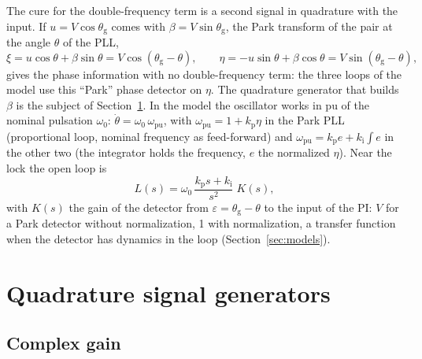 \documentclass[11pt,a4paper]{scrartcl}
\newcommand{\ped}[1]{_{\mathrm{#1}}}
\begin{document}
\begin{onehalfspace}
The cure for the double-frequency term is a second signal in quadrature with the input. If $u = V\cos\theta\ped{g}$ comes with $\beta = V\sin\theta\ped{g}$, the Park transform of the pair at the angle $\theta$ of the PLL,
\begin{equation}
	\xi = u\cos\theta + \beta\sin\theta = V\cos(\theta\ped{g} - \theta), \qquad \eta = -u\sin\theta + \beta\cos\theta = V\sin(\theta\ped{g} - \theta),
	\label{eq:park}
\end{equation}
gives the phase information with no double-frequency term: the three loops of the model use this ``Park'' phase detector on $\eta$. The quadrature generator that builds $\beta$ is the subject of Section~\ref{sec:qsg}. In the model the oscillator works in pu of the nominal pulsation $\omega_0$: $\dot\theta = \omega_0\,\omega\ped{pu}$, with $\omega\ped{pu} = 1 + k\ped{p}\eta$ in the Park PLL (proportional loop, nominal frequency as feed-forward) and $\omega\ped{pu} = k\ped{p} e + k\ped{i}\int e$ in the other two (the integrator holds the frequency, $e$ the normalized $\eta$). Near the lock the open loop is
\begin{equation}
	L(s) = \omega_0\,\frac{k\ped{p} s + k\ped{i}}{s^2}\; K(s),
	\label{eq:Lgen}
\end{equation}
with $K(s)$ the gain of the detector from $\varepsilon = \theta\ped{g} - \theta$ to the input of the PI: $V$ for a Park detector without normalization, \num{1} with normalization, a transfer function when the detector has dynamics in the loop (Section~\ref{sec:models}).

\section{Quadrature signal generators}
\label{sec:qsg}

\subsection{Complex gain}
\label{sec:cgain}


\end{onehalfspace}
\end{document}
